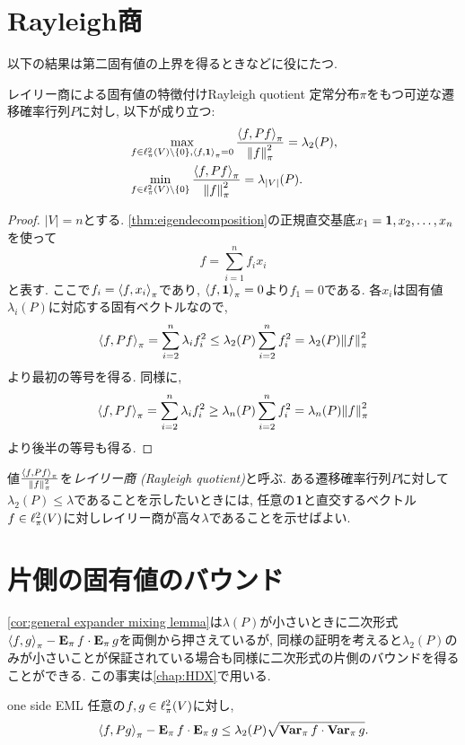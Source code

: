 \section{Rayleigh商}
以下の結果は第二固有値の上界を得るときなどに役にたつ.
\begin{lemma}{レイリー商による固有値の特徴付け}{Rayleigh quotient}
  定常分布$\pi$をもつ可逆な遷移確率行列$P$に対し, 以下が成り立つ:
  \begin{align*}
    &\max_{f \in \ell^2_\pi(V)\setminus\{0\},\left\langle f,\mathbf{1}\right\rangle_{\pi}=0}\frac{\left\langle f,Pf\right\rangle_{\pi}}{\left\lVert f\right\rVert_{\pi}^2}=\lambda_2(P),\\
    &\min_{f \in \ell^2_\pi(V)\setminus\{0\}}\frac{\left\langle f,Pf\right\rangle_{\pi}}{\left\lVert f\right\rVert_{\pi}^2}=\lambda_{|V|}(P).
  \end{align*}
\end{lemma}
\begin{proof}
  $|V|=n$とする.
  \cref{thm:eigendecomposition}の正規直交基底$x_1=\mathbf{1},x_2,\dots,x_n$を使って
  \[
    f = \sum_{i=1}^n f_i x_i
  \]
  と表す.
  ここで$f_i = \left\langle f,x_i\right\rangle_{\pi}$であり, $\left\langle f,\mathbf{1}\right\rangle_{\pi}=0$より$f_1 =0$である.
  各$x_i$は固有値$\lambda_i(P)$に対応する固有ベクトルなので,
  \begin{align*}
    \piprod{f,Pf} = \sum_{i=2}^n\lambda_i f_i^2 \le \lambda_2(P) \sum_{i=2}^n f_i^2 = \lambda_2(P) \pinorm{f}^2
  \end{align*}
  より最初の等号を得る.
  同様に,
  \begin{align*}
    \piprod{f,Pf} = \sum_{i=2}^n\lambda_i f_i^2 \ge \lambda_n(P) \sum_{i=2}^n f_i^2 = \lambda_n(P) \pinorm{f}^2
  \end{align*}
  より後半の等号も得る.
\end{proof}

値$\frac{\left\langle f,Pf\right\rangle_{\pi}}{\left\lVert f\right\rVert_{\pi}^2}$を\emph{レイリー商 (Rayleigh quotient)}と呼ぶ.
ある遷移確率行列$P$に対して$\lambda_2(P) \le \lambda$であることを示したいときには,
任意の$\mathbf{1}$と直交するベクトル$f\in\ell^2_\pi(V)$に対しレイリー商が高々$\lambda$であることを示せばよい.

\section{片側の固有値のバウンド}
\cref{cor:general expander mixing lemma}は$\lambda(P)$が小さいときに二次形式$\left\langle f,g\right\rangle_{\pi} - \operatorname*{\mathbf{E}_{\pi}} f \cdot \operatorname*{\mathbf{E}_{\pi}} g$を両側から押さえているが,
同様の証明を考えると$\lambda_2(P)$のみが小さいことが保証されている場合も同様に二次形式の片側のバウンドを得ることができる.
この事実は\cref{chap:HDX}で用いる.
\begin{lemma}{}{one side EML}
  任意の$f,g\in \ell^2_\pi(V)$に対し,
  \[
    \left\langle f,Pg\right\rangle_{\pi} - \operatorname*{\mathbf{E}_{\pi}} f\cdot \operatorname*{\mathbf{E}_{\pi}} g \le \lambda_2(P)\sqrt{\operatorname*{\mathbf{Var}_{\pi}} f \cdot \operatorname*{\mathbf{Var}_{\pi}} g}.
  \]
\end{lemma}
